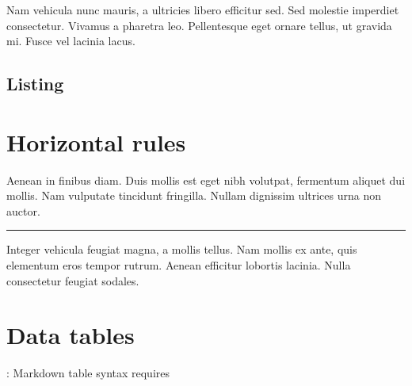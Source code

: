\documentclass[letterpaper,10pt,english]{sphinxmanual}
\begin{document}
Nam vehicula nunc  mauris, a ultricies libero efficitur
sed. Sed molestie imperdiet consectetur. Vivamus a pharetra leo. Pellentesque
eget ornare tellus, ut gravida mi. Fusce vel lacinia lacus.


\subsection{Listing}
\label{\detokenize{markdown:listing}}
\begin{sphinxVerbatim}[commandchars=\\\{\}]
    
           
       \PYG{p}{[}\PYG{p}{]}
         
      \PYG{p}{[}\PYG{p}{]}  \PYG{p}{[}\PYG{p}{]}
   
\end{sphinxVerbatim}


\section{Horizontal rules}
\label{\detokenize{markdown:horizontal-rules}}
Aenean in finibus diam. Duis mollis est eget nibh volutpat, fermentum aliquet
dui mollis. Nam vulputate tincidunt fringilla. Nullam dignissim ultrices urna
non auctor.


\bigskip\hrule\bigskip


Integer vehicula feugiat magna, a mollis tellus. Nam mollis ex ante, quis
elementum eros tempor rutrum. Aenean efficitur lobortis lacinia. Nulla
consectetur feugiat sodales.


\section{Data tables}
\label{\detokenize{markdown:data-tables}}
: Markdown table syntax requires 
\end{document}
